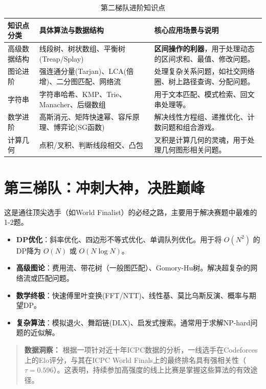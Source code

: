 \documentclass[12pt,a4paper]{article}
\begin{document}
	\begin{table}[h!]
		\centering
		\caption{第二梯队进阶知识点}
		\label{tab:tier2}
		\begin{tabularx}{\textwidth}{|X|X|X|}
			\hline
			\rowcolor{lightgray} \textbf{知识点分类} & \textbf{具体算法与数据结构} & \textbf{核心应用场景与说明} \\ \hline
			高级数据结构 & 线段树、树状数组、平衡树(Treap/Splay) & \textbf{区间操作的利器}，用于处理动态的区间求和、最值、修改问题。 \\ \hline
			图论进阶 & 强连通分量(Tarjan)、LCA(倍增)、二分图匹配、网络流 & 处理复杂关系问题，如社交网络圈、树上路径查询、分配问题。 \\ \hline
			字符串 & 字符串哈希、KMP、Trie、Manacher、后缀数组 & 用于文本匹配、模式检索、回文串处理等。 \\ \hline
			数学进阶 & 高斯消元、矩阵快速幂、容斥原理、博弈论(SG函数) & 解决线性方程组、递推优化、计数问题和组合游戏。 \\ \hline
			计算几何 & 点积/叉积、判断线段相交、凸包 & 叉积是计算几何的灵魂，用于处理几何图形相关问题。 \\ \hline
		\end{tabularx}
	\end{table}
	
	\section{第三梯队：冲刺大神，决胜巅峰}
	这是通往顶尖选手（如World Finalist）的必经之路，主要用于解决赛题中最难的1-2题。
	
	\begin{itemize}
		\item \textbf{DP优化}：斜率优化、四边形不等式优化、单调队列优化。用于将 \(O(N^2)\) 的DP降为 \(O(N)\) 或 \(O(N \log N)\)。
		\item \textbf{高级图论}：费用流、带花树（一般图匹配）、Gomory-Hu树。解决超复杂的网络流或匹配问题。
		\item \textbf{数学终极}：快速傅里叶变换(FFT/NTT)、线性基、莫比乌斯反演、概率与期望DP。
		\item \textbf{复杂算法}：模拟退火、舞蹈链(DLX)、启发式搜索。通常用于求解NP-hard问题的近似解。
	\end{itemize}
	
	\begin{quote}
		\textbf{数据洞察：} 根据一项针对近十年ICPC数据的分析，一线选手在Codeforces上的Elo评分，与其在ICPC World Finals上的最终排名具有强相关性（\( \tau = 0.596 \)）。这表明，持续参加高强度的线上比赛是掌握这些算法的有效途径。
	\end{quote}
	
\end{document}
